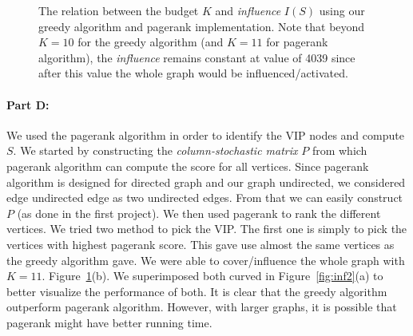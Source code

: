 \begin{figure}[!tbh]
\centering        
   \caption{The relation between the budget $K$ and {\itshape{influence}} $I(S)$ using our greedy algorithm and pagerank implementation. Note that beyond $K=10$ for the greedy algorithm (and $K=11$ for pagerank algorithm), the {\itshape{influence}} remains constant at value of 4039 since after this value the whole graph would be influenced/activated.  }
   \label{fig:inf}
\end{figure}


\paragraph{Part D:}
We used the pagerank algorithm in order to identify the VIP nodes and compute $S$. We started by constructing the \emph{column-stochastic matrix} $P$ from which pagerank algorithm can compute the score for all vertices. Since pagerank algorithm is designed for directed graph and our graph undirected, we considered edge undirected edge as two undirected edges. From that we can easily construct $P$ (as done in the first project). We then used pagerank to rank the different vertices. We tried two method to pick the VIP. The first one is simply to pick the vertices with highest pagerank score. This gave use almost the same vertices as the greedy algorithm gave. We were able to cover/influence the whole graph with $K=11$. Figure~\ref{fig:inf}(b). We superimposed both curved in Figure~\ref{fig:inf2}(a) to better visualize the performance of both. It is clear that the greedy algorithm outperform pagerank algorithm. However, with larger graphs, it is possible that pagerank might have better running time. 


